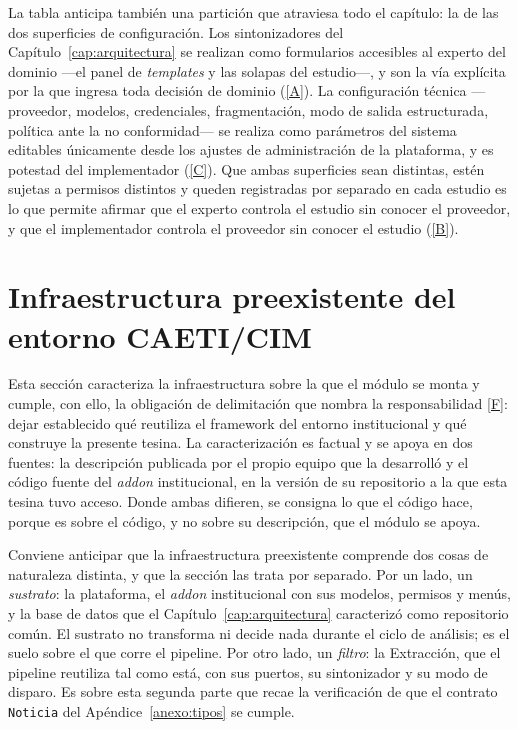 \documentclass[12pt]{report}
\DeclareRobustCommand{\resp}[1]{\hyperref[tab:registro-responsabilidades]{\textcolor{respcolor}{[#1]}}}
\begin{document}
La tabla anticipa también una partición que atraviesa todo el capítulo: la de las dos superficies de configuración. Los sintonizadores del Capítulo~\ref{cap:arquitectura} se realizan como formularios accesibles al experto del dominio ---el panel de \textit{templates} y las solapas del estudio---, y son la vía explícita por la que ingresa toda decisión de dominio (\resp{A}). La configuración técnica ---proveedor, modelos, credenciales, fragmentación, modo de salida estructurada, política ante la no conformidad--- se realiza como parámetros del sistema editables únicamente desde los ajustes de administración de la plataforma, y es potestad del implementador (\resp{C}). Que ambas superficies sean distintas, estén sujetas a permisos distintos y queden registradas por separado en cada estudio es lo que permite afirmar que el experto controla el estudio sin conocer el proveedor, y que el implementador controla el proveedor sin conocer el estudio (\resp{B}).

\section{Infraestructura preexistente del entorno CAETI/CIM}
\label{sec:impl-preexistente}

Esta sección caracteriza la infraestructura sobre la que el módulo se monta y cumple, con ello, la obligación de delimitación que nombra la responsabilidad \resp{F}: dejar establecido qué reutiliza el framework del entorno institucional y qué construye la presente tesina. La caracterización es factual y se apoya en dos fuentes: la descripción publicada por el propio equipo que la desarrolló \citep{raimondo:2024} y el código fuente del \textit{addon} institucional, en la versión de su repositorio a la que esta tesina tuvo acceso. Donde ambas difieren, se consigna lo que el código hace, porque es sobre el código, y no sobre su descripción, que el módulo se apoya.

Conviene anticipar que la infraestructura preexistente comprende dos cosas de naturaleza distinta, y que la sección las trata por separado. Por un lado, un \textit{sustrato}: la plataforma, el \textit{addon} institucional con sus modelos, permisos y menús, y la base de datos que el Capítulo~\ref{cap:arquitectura} caracterizó como repositorio común. El sustrato no transforma ni decide nada durante el ciclo de análisis; es el suelo sobre el que corre el pipeline. Por otro lado, un \textit{filtro}: la Extracción, que el pipeline reutiliza tal como está, con sus puertos, su sintonizador y su modo de disparo. Es sobre esta segunda parte que recae la verificación de que el contrato \texttt{Noticia} del Apéndice~\ref{anexo:tipos} se cumple.
\end{document}
